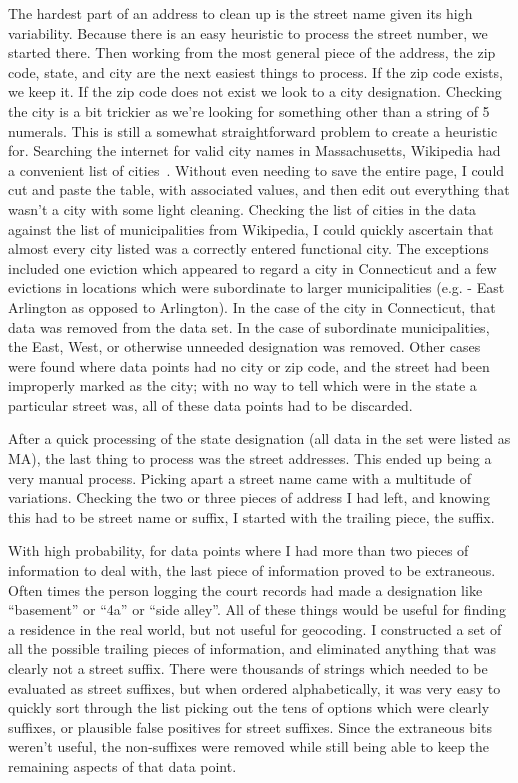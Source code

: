 \par The hardest part of an address to clean up is the street name given its high variability.  Because there is an easy heuristic to process the street number, we started there.  Then working from the most general piece of the address, the zip code, state, and city are the next easiest things to process.  If the zip code exists, we keep it.  If the zip code does not exist we look to a city designation.  Checking the city is a bit trickier as we’re looking for something other than a string of 5 numerals.  This is still a somewhat straightforward problem to create a heuristic for.  Searching the internet for valid city names in Massachusetts, Wikipedia had a convenient list of cities~\citep{website:17}.  Without even needing to save the entire page, I could cut and paste the table, with associated values, and then edit out everything that wasn’t a city with some light cleaning.  Checking the list of cities in the data against the list of municipalities from Wikipedia, I could quickly ascertain that almost every city listed was a correctly entered functional city.  The exceptions included one eviction which appeared to regard a city in Connecticut and a few evictions in locations which were subordinate to larger municipalities (e.g. - East Arlington as opposed to Arlington).  In the case of the city in Connecticut, that data was removed from the data set.  In the case of subordinate municipalities, the East, West, or otherwise unneeded designation was removed.  Other cases were found where data points had no city or zip code, and the street had been improperly marked as the city; with no way to tell which were in the state a particular street was, all of these data points had to be discarded.

\par After a quick processing of the state designation (all data in the set were listed as MA), the last thing to process was the street addresses.  This ended up being a very manual process.  Picking apart a street name came with a multitude of variations.  Checking the two or three pieces of address I had left, and knowing this had to be street name or suffix, I started with the trailing piece, the suffix.

\par With high probability, for data points where I had more than two pieces of information to deal with, the last piece of information proved to be extraneous.  Often times the person logging the court records had made a designation like “basement” or “4a” or “side alley”.  All of these things would be useful for finding a residence in the real world, but not useful for geocoding.  I constructed a set of all the possible trailing pieces of information, and eliminated anything that was clearly not a street suffix.  There were thousands of strings which needed to be evaluated as street suffixes, but when ordered alphabetically, it was very easy to quickly sort through the list picking out the tens of options which were clearly suffixes, or plausible false positives for street suffixes.  Since the extraneous bits weren’t useful, the non-suffixes were removed while still being able to keep the remaining aspects of that data point. \par

